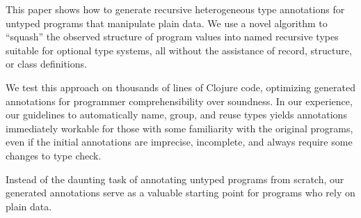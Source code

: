 
This paper shows how to
generate recursive heterogeneous type annotations for
untyped programs that manipulate plain data.
We use a novel algorithm to ``squash'' the observed structure
of program values into named recursive types suitable for
optional type systems,
all without the assistance of record, structure, or class
definitions.

We test this approach on thousands of lines of Clojure code,
optimizing generated annotations
for programmer comprehensibility over soundness.
In our experience, our guidelines
to automatically name, group, and reuse
types yields annotations
immediately workable for those with some familiarity with
the original programs,
even if the initial annotations are imprecise, incomplete,
and always require some changes to type check.

Instead of the daunting task of annotating untyped programs
from scratch, our generated annotations
serve as a valuable starting point for programs
who rely on plain data.

%
%
%
%
%
